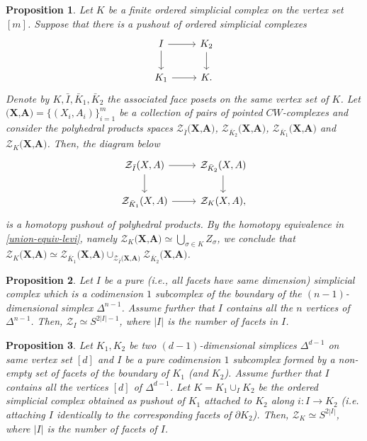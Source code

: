 \documentclass[10pt,a4paper]{amsart}
\newtheorem{proposition}{Proposition}
\newcommand{\ZZ}{\mathcal{Z}}
\begin{document}
\begin{proposition}\label{induce-pushout}
	Let $K$ be a finite ordered simplicial complex on the vertex set $[m]$. Suppose that there is a pushout of ordered simplicial complexes 
	\[
	\begin{tikzcd}
		I \arrow[r] \arrow[d] & K_2 \arrow[d] \\
		K_1 \arrow[r]  & K. 
	\end{tikzcd}
	\]
	Denote by $K, \bar I, \bar K_1, \bar K_2$ the associated face posets on the same vertex set of $K$. Let $\textbf{(X,A)} = \{(X_i,A_i)\}_{i=1}^m$ be a collection of pairs of pointed $CW$-complexes and consider the polyhedral products spaces $\ZZ_{\bar I}\textbf{(X,A)}$, $\ZZ_{\bar K_2}\textbf{(X,A)}$, $\ZZ_{\bar K_1}\textbf{(X,A)}$ and $\ZZ_{K}\textbf{(X,A)}$. Then, the diagram below
	\[
	\begin{tikzcd}
		\ZZ_{\bar I}\textbf{(X,A)} \arrow[r] \arrow[d] & \ZZ_{\bar K_2}\textbf{(X,A)} \arrow[d] \\
		\ZZ_{\bar K_1}\textbf{(X,A)} \arrow[r]  & \ZZ_{K}\textbf{(X,A)},
	\end{tikzcd}
	\] 
	is a homotopy pushout of polyhedral products. By the homotopy equivalence in \ref{union-equiv-levi}, namely $\ZZ_{K}\textbf{(X,A)} \simeq \bigcup_{\sigma \in K} Z_\sigma$, we conclude that $\ZZ_{K}\textbf{(X,A)} \simeq \ZZ_{{\bar K_1}}\textbf{(X,A)}\cup_{\ZZ_{\bar I}\textbf{(X,A)}} \ZZ_{\bar K_2}\textbf{(X,A)}$.  
\end{proposition}

\begin{proposition}\label{prop-pute-boundary-momentangle}
Let $I$ be a pure (i.e., all facets have same dimension) simplicial complex which is a codimension $1$ subcomplex of the boundary of the $(n-1)$-dimensional simplex $\Delta^{n-1}$. Assume further that $I$ contains all the $n$ vertices of $\Delta^{n-1}$. Then, $\ZZ_I \simeq S^{2|I|-1}$, where $|I|$ is the number of facets in $I$.
\end{proposition}

\begin{proposition}\label{push-glue}
	Let $K_1,K_2$ be two $(d-1)$-dimensional simplices $\Delta^{d-1}$ on same vertex set $[d]$ and $I$ be a pure codimension $1$ subcomplex formed by a non-empty set of facets of the boundary of $K_1$ (and $K_2$). Assume further that $I$ contains all the vertices $[d]$ of $\Delta^{d-1}$. Let $K = K_1 \cup_I K_2$ be the ordered simplicial complex obtained as pushout of $K_1$ attached to $K_2$ along $i: I \to K_2$ (i.e. attaching $I$ identically to the corresponding facets of $\partial K_2$). Then, $\ZZ_K \simeq S^{2|I|}$, where $|I|$ is the number of facets of $I$. 
\end{proposition}
\end{document}
